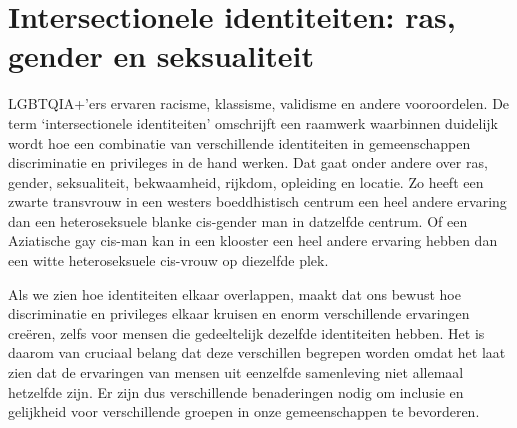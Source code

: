 \documentclass[12pt,openany]{book}
\begin{document}
\section*{Intersectionele identiteiten: ras, gender en seksualiteit}

LGBTQIA+'ers ervaren racisme, klassisme, validisme en andere vooroordelen. De term `intersectionele identiteiten' omschrijft een raamwerk waarbinnen duidelijk wordt hoe een combinatie van verschillende identiteiten in gemeenschappen discriminatie en privileges in de hand werken. Dat gaat onder andere over ras, gender, seksualiteit, bekwaamheid, rijkdom, opleiding en locatie. Zo heeft een zwarte transvrouw in een westers boeddhistisch centrum een heel andere ervaring dan een heteroseksuele blanke cis-gender man in datzelfde centrum. Of een Aziatische gay cis-man kan in een klooster een heel andere ervaring hebben dan een witte heteroseksuele cis-vrouw op diezelfde plek.

Als we zien hoe identiteiten elkaar overlappen, maakt dat ons bewust hoe discriminatie en privileges elkaar kruisen en enorm verschillende ervaringen creëren, zelfs voor mensen die gedeeltelijk dezelfde identiteiten hebben. Het is daarom van cruciaal belang dat deze verschillen begrepen worden omdat het laat zien dat de ervaringen van mensen uit eenzelfde samenleving niet allemaal hetzelfde zijn. Er zijn dus verschillende benaderingen nodig om inclusie en gelijkheid voor verschillende groepen in onze gemeenschappen te bevorderen.

\begin{figure}[h]
    \centering
\end{figure}
\end{document}
